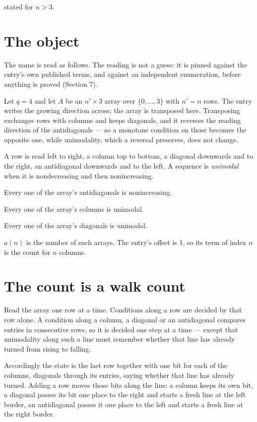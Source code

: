 \documentclass[11pt]{article}
\theoremstyle{definition}
\begin{document}
stated for $n > 3$.

\section{The object}

The name is read as follows. The reading is not a guess: it is pinned against the entry's own published terms, and against an independent enumeration, before anything is proved (Section 7).

Let $q = 4$ and let $A$ be an $n' \times 3$ array over $\{0,\dots,3\}$ with $n' = n$ rows. The entry writes the growing direction across; the array is transposed here. Transposing exchanges rows with columns and keeps diagonals, and it reverses the reading direction of the antidiagonals --- so a monotone condition on those becomes the opposite one, while unimodality, which a reversal preserves, does not change.

A row is read left to right, a column top to bottom, a diagonal downwards and to the right, an antidiagonal downwards and to the left. A sequence is {\itshape unimodal} when it is nondecreasing and then nonincreasing.

Every one of the array's antidiagonals is nonincreasing.

Every one of the array's columns is unimodal.

Every one of the array's diagonals is unimodal.

$a(n)$ is the number of such arrays. The entry's offset is 1, so its term of index $n$ is the count for $n$ columns.

\section{The count is a walk count}

Read the array one row at a time. Conditions along a row are decided by that row alone. A condition along a column, a diagonal or an antidiagonal compares entries in consecutive rows, so it is decided one step at a time --- except that unimodality along such a line must remember whether that line has already turned from rising to falling.

Accordingly the state is the last row together with one bit for each of the columns, diagonals through its entries, saying whether that line has already turned. Adding a row moves those bits along the line: a column keeps its own bit, a diagonal passes its bit one place to the right and starts a fresh line at the left border, an antidiagonal passes it one place to the left and starts a fresh line at the right border.
\end{document}
